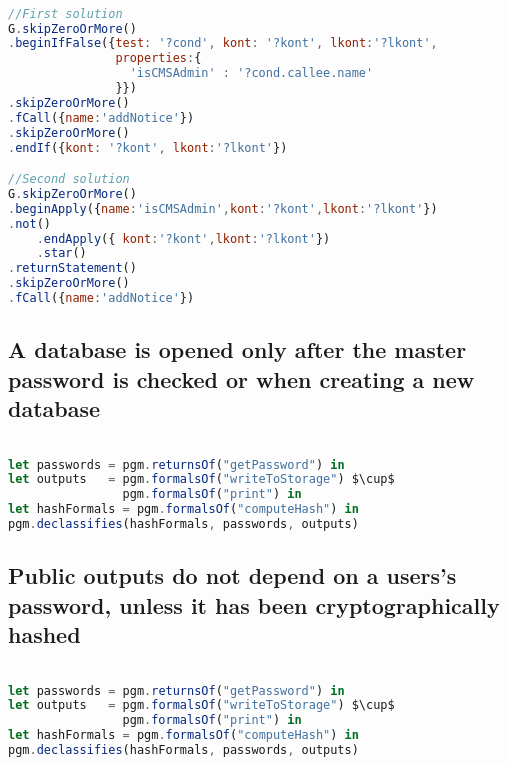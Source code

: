 \begin{lstlisting}[label={lst:Policy4JSQL},language=JavaScript,caption=Policy 4 in JS-QL]  % float=t?

//First solution
G.skipZeroOrMore()
.beginIfFalse({test: '?cond', kont: '?kont', lkont:'?lkont', 
               properties:{
                 'isCMSAdmin' : '?cond.callee.name'
               }})
.skipZeroOrMore()
.fCall({name:'addNotice'})
.skipZeroOrMore()
.endIf({kont: '?kont', lkont:'?lkont'})

//Second solution
G.skipZeroOrMore()
.beginApply({name:'isCMSAdmin',kont:'?kont',lkont:'?lkont'})
.not()
    .endApply({ kont:'?kont',lkont:'?lkont'})
    .star()
.returnStatement()
.skipZeroOrMore()
.fCall({name:'addNotice'})

\end{lstlisting}


\subsection{A database is opened only after the master password
is checked or when creating a new database}

\begin{lstlisting}[label={lst:Policy5PidginQL},language=JavaScript,caption=Policy 5 in PidginQL,mathescape=true]  % float=t?

let passwords = pgm.returnsOf("getPassword") in 
let outputs   = pgm.formalsOf("writeToStorage") $\cup$
                pgm.formalsOf("print") in
let hashFormals = pgm.formalsOf("computeHash") in
pgm.declassifies(hashFormals, passwords, outputs)
\end{lstlisting}

\subsection{Public outputs do not depend on a users's password, unless it has been cryptographically hashed}

\begin{lstlisting}[label={lst:Policy6PidginQL},language=JavaScript,caption=Policy 6 in PidginQL,mathescape=true]  % float=t?

let passwords = pgm.returnsOf("getPassword") in 
let outputs   = pgm.formalsOf("writeToStorage") $\cup$
                pgm.formalsOf("print") in
let hashFormals = pgm.formalsOf("computeHash") in
pgm.declassifies(hashFormals, passwords, outputs)
\end{lstlisting}



